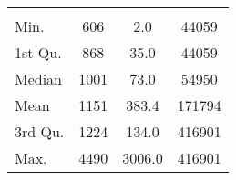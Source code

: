 \begin{tabular}{lS[table-format=5.1]S[table-format=5.1]S[table-format=5.1]}
&  &  &  \\
 Min.    & 606 & 2.0 & 44059 \\
 1st Qu. & 868 & 35.0 & 44059 \\
 Median  & 1001 & 73.0 & 54950 \\
 Mean    & 1151 & 383.4 & 171794 \\
 3rd Qu. & 1224 & 134.0 & 416901 \\
 Max.    & 4490 & 3006.0 & 416901 \\
\end{tabular}
